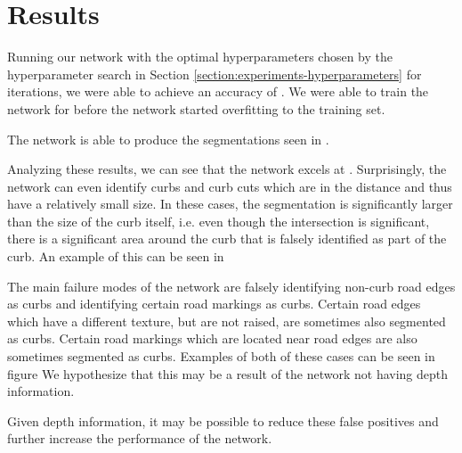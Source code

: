 \section{Results}\label{section:experiments-results}
Running our network with the optimal hyperparameters chosen by the hyperparameter search in Section \ref{section:experiments-hyperparameters} for  iterations, we were able to achieve an accuracy of .
We were able to train the network for  before the network started overfitting to the training set.

The network is able to produce the segmentations seen in .

Analyzing these results, we can see that the network excels at .
Surprisingly, the network can even identify curbs and curb cuts which are in the distance and thus have a relatively small size.
In these cases, the segmentation is significantly larger than the size of the curb itself, i.e. even though the intersection is significant, there is a significant area around the curb that is falsely identified as part of the curb.
An example of this can be seen in 

The main failure modes of the network are falsely identifying non-curb road edges as curbs and identifying certain road markings as curbs.
Certain road edges which have a different texture, but are not raised, are sometimes also segmented as curbs.
Certain road markings which are located near road edges are also sometimes segmented as curbs.
Examples of both of these cases can be seen in figure 
We hypothesize that this may be a result of the network not having depth information.

Given depth information, it may be possible to reduce these false positives and further increase the performance of the network.
